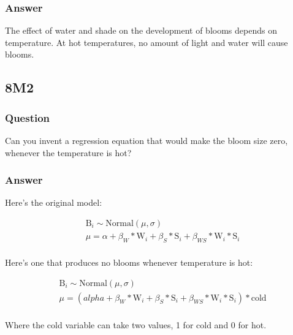 \documentclass[
]{book}
\begin{document}
\hypertarget{answer-78}{%
\subsubsection*{Answer}\label{answer-78}}

The effect of water and shade on the development of blooms depends on temperature. At hot temperatures, no amount of light and water will cause blooms.

\hypertarget{m2-5}{%
\subsection*{8M2}\label{m2-5}}

\hypertarget{question-79}{%
\subsubsection*{Question}\label{question-79}}

Can you invent a regression equation that would make the bloom size zero, whenever the temperature is hot?

\hypertarget{answer-79}{%
\subsubsection*{Answer}\label{answer-79}}

Here's the original model:

\[
\begin{aligned}
&\text{B}_i \sim \text{Normal}(\mu,\sigma) \\
&\mu = \alpha + \beta_{W} * \text{W}_i + \beta_S * \text{S}_i + \beta_{WS} * \text{W}_i* \text{S}_i  \\
\end{aligned}
\]

Here's one that produces no blooms whenever temperature is hot:

\[
\begin{aligned}
&\text{B}_i \sim \text{Normal}(\mu,\sigma) \\
&\mu = \left( alpha + \beta_{W} * \text{W}_i + \beta_S * \text{S}_i + \beta_{WS} * \text{W}_i* \text{S}_i \right) * \text{cold}  \\
\end{aligned}
\]

Where the cold variable can take two values, 1 for cold and 0 for hot.
\end{document}
